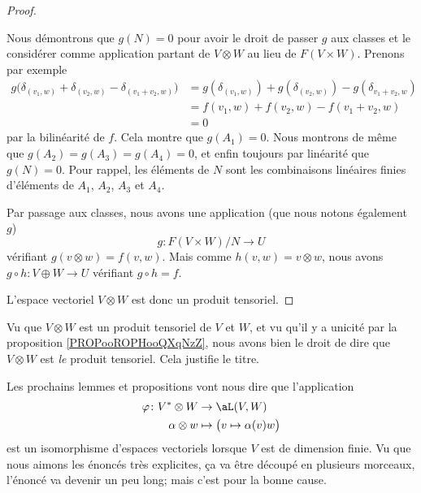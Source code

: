 \begin{proof}
\begin{subproof}
            Nous démontrons que \( g(N)=0\) pour avoir le droit de passer \( g\) aux classes et le considérer comme application partant de \( V\otimes W\) au lieu de \( F(V\times W)\). Prenons par exemple
            \begin{subequations}
                \begin{align}
                    g\big( \delta_{(v_1,w)}+\delta_{(v_2,w)}-\delta_{(v_1+v_2,w)} \big)&=g( \delta_{(v_1,w)} )+g(\delta_{(v_2,w)})-g(\delta_{v_1+v_2,w})\\
                    &=f(v_1,w)+f(v_2,w)-f(v_1+v_2,w)\\
                    &=0
                \end{align}
            \end{subequations}
            par la bilinéarité de \( f\). Cela montre que \( g(A_1)=0\). Nous montrons de même que \( g(A_2)=g(A_3)=g(A_4)=0\), et enfin toujours par linéarité que \( g(N)=0\). Pour rappel, les éléments de \( N\) sont les combinaisons linéaires finies d'éléments de \( A_1\), \( A_2\), \( A_3\) et \( A_4\).

            Par passage aux classes, nous avons une application (que nous notons également \( g\))
            \begin{equation}
                g\colon F(V\times W)/N\to U
            \end{equation}
            vérifiant \( g(v\otimes w)=f(v,w)\). Mais comme \( h(v,w)=v\otimes w\), nous avons $g\circ h\colon V\oplus W\to U$ vérifiant \( g\circ h=f\).
    \end{subproof}
    L'espace vectoriel \( V\otimes W\) est donc un produit tensoriel.
\end{proof}

\begin{normaltext}
    Vu que \( V\otimes W\) est un produit tensoriel de \( V\) et \( W\), et vu qu'il y a unicité par la proposition \ref{PROPooROPHooQXqNzZ}, nous avons bien le droit de dire que \( V\otimes W\) est \emph{le} produit tensoriel. Cela justifie le titre.
\end{normaltext}

\begin{normaltext}
    Les prochains lemmes et propositions vont nous dire que l'application
    \begin{equation}
        \begin{aligned}
            \varphi\colon V^*\otimes W&\to \aL(V,W) \\
            \alpha\otimes w&\mapsto \big( v\mapsto \alpha(v)w \big) 
        \end{aligned}
    \end{equation}
    est un isomorphisme d'espaces vectoriels lorsque \( V\) est de dimension finie. Vu que nous aimons les énoncés très explicites, ça va être découpé en plusieurs morceaux, l'énoncé va devenir un peu long; mais c'est pour la bonne cause.
\end{normaltext}

